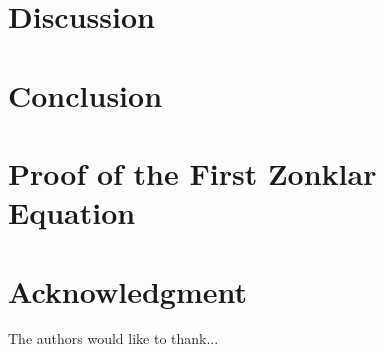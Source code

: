 \documentclass[conference]{IEEEtran}
\begin{document}
\section{Discussion}

\section{Conclusion}





%


\appendices
\section{Proof of the First Zonklar Equation}
\blindtext

\section*{Acknowledgment}


The authors would like to thank...


\ifCLASSOPTIONcaptionsoff
  \newpage
\fi
\end{document}
